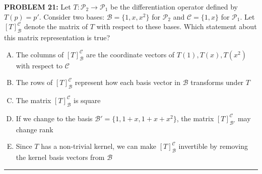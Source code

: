 \documentclass[12pt]{amsart}
\newcommand{\divider}{
  \vspace{-1em} %
  \noindent
  \raisebox{-0.15ex}{\textbullet}%
  \hspace{0.5em}%
  \rule[0.5ex]{0.95\textwidth}{1.0pt}%
  \hspace{0.5em}%
  \raisebox{-0.15ex}{\textbullet}%
  \vspace{0em} %
}
\begin{document}
{\bf PROBLEM 21:}
Let $T: \mathcal{P}_2 \to \mathcal{P}_1$ be the differentiation operator defined by $T(p) = p'$. 
Consider two bases: $\mathcal{B} = \{1, x, x^2\}$ for $\mathcal{P}_2$ and $\mathcal{C} = \{1, x\}$ for $\mathcal{P}_1$.
Let $[T]_{\mathcal{B}}^{\mathcal{C}}$ denote the matrix of $T$ with respect to these bases.
Which statement about this matrix representation is true?
%
\begin{enumerate}[(A)]
\item The columns of $[T]_{\mathcal{B}}^{\mathcal{C}}$ are the coordinate vectors of $T(1), T(x), T(x^2)$ with respect to $\mathcal{C}$
\item The rows of $[T]_{\mathcal{B}}^{\mathcal{C}}$ represent how each basis vector in $\mathcal{B}$ transforms under $T$
\item The matrix $[T]_{\mathcal{B}}^{\mathcal{C}}$ is square
\item If we change to the basis $\mathcal{B}' = \{1, 1+x, 1+x+x^2\}$, the matrix $[T]_{\mathcal{B}'}^{\mathcal{C}}$ may change rank
\item Since $T$ has a non-trivial kernel, we can make $[T]_{\mathcal{B}}^{\mathcal{C}}$ invertible by removing the kernel basis vectors from $\mathcal{B}$
\end{enumerate}
%
%
\divider


\newpage
\end{document}
